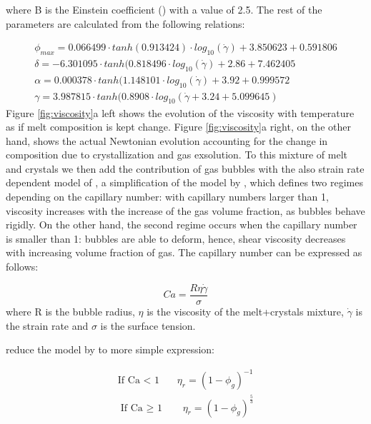 where B is the Einstein coefficient (\cite{einstein1905}) with a value of 2.5. The rest of the parameters are calculated from the following relations:

\begin{equation}
	\begin{aligned}
		\phi_{max} = 0.066499·tanh(0.913424)·log_{10}(\dot{\gamma}) + 3.850623 + 0.591806 \\
		\delta =-6.301095·tanh(0.818496·log_{10}(\dot{\gamma}) + 2.86 + 7.462405 \\
		\alpha = 0.000378·tanh(1.148101·log_{10}(\dot{\gamma}) +3.92+0.999572 \\
		\gamma = 3.987815·tanh(0.8908·log_{10}(\dot{\gamma} + 3.24 + 5.099645)        
	\end{aligned}
\end{equation}
Figure \ref{fig:viscosity}a left shows the evolution of the viscosity with temperature as if melt composition is kept change. Figure \ref{fig:viscosity}a right, on the other hand, shows the actual Newtonian evolution accounting for the change in composition due to crystallization and gas exsolution. 
To this mixture of melt and crystals we then add the contribution of gas bubbles with the also strain rate dependent model of \cite{llewellin2005}, a simplification of the model by \cite{pal2003}, which defines two regimes depending on the capillary number: with capillary numbers larger than 1, viscosity increases with the increase of the gas volume fraction, as bubbles behave rigidly. On the other hand, the second regime occurs when the capillary number is smaller than 1: bubbles are able to deform, hence, shear viscosity decreases with increasing volume fraction of gas. The capillary number can be expressed as follows:

\begin{equation}
	Ca = \frac{R\eta\dot{\gamma}}{\sigma}
\end{equation}
where R is the bubble radius, $\eta$ is the viscosity of the melt+crystals mixture, $\dot{\gamma}$ is the strain rate and $\sigma$ is the surface tension.

\cite{llewellin2005} reduce the model by \cite{pal2003} to more simple expression: 

\begin{equation}
	\begin{aligned}
		\text{If Ca < 1} \ \ \ \ \ \ \ \ \eta_r=(1-\phi_g)^{-1} \\
		\text{If Ca $\geq$ 1} \ \ \ \ \ \ \ \ \eta_r=(1-\phi_g)^{\frac{5}{3}}
	\end{aligned}
\end{equation}

